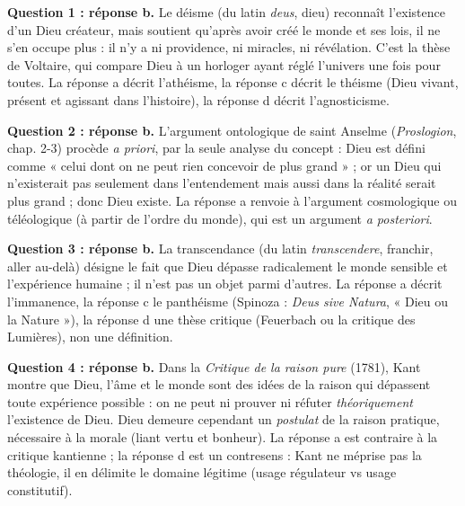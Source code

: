 \documentclass[11pt]{article}
\begin{document}
\begin{corrige}
\textbf{Question 1 : réponse b.} Le déisme (du latin \emph{deus}, dieu) reconnaît l'existence d'un Dieu créateur, mais soutient qu'après avoir créé le monde et ses lois, il ne s'en occupe plus : il n'y a ni providence, ni miracles, ni révélation. C'est la thèse de Voltaire, qui compare Dieu à un horloger ayant réglé l'univers une fois pour toutes. La réponse a décrit l'athéisme, la réponse c décrit le théisme (Dieu vivant, présent et agissant dans l'histoire), la réponse d décrit l'agnosticisme.

\textbf{Question 2 : réponse b.} L'argument ontologique de saint Anselme (\emph{Proslogion}, chap. 2-3) procède \emph{a priori}, par la seule analyse du concept : Dieu est défini comme « celui dont on ne peut rien concevoir de plus grand » ; or un Dieu qui n'existerait pas seulement dans l'entendement mais aussi dans la réalité serait plus grand ; donc Dieu existe. La réponse a renvoie à l'argument cosmologique ou téléologique (à partir de l'ordre du monde), qui est un argument \emph{a posteriori}.

\textbf{Question 3 : réponse b.} La transcendance (du latin \emph{transcendere}, franchir, aller au-delà) désigne le fait que Dieu dépasse radicalement le monde sensible et l'expérience humaine ; il n'est pas un objet parmi d'autres. La réponse a décrit l'immanence, la réponse c le panthéisme (Spinoza : \emph{Deus sive Natura}, « Dieu ou la Nature »), la réponse d une thèse critique (Feuerbach ou la critique des Lumières), non une définition.

\textbf{Question 4 : réponse b.} Dans la \emph{Critique de la raison pure} (1781), Kant montre que Dieu, l'âme et le monde sont des idées de la raison qui dépassent toute expérience possible : on ne peut ni prouver ni réfuter \emph{théoriquement} l'existence de Dieu. Dieu demeure cependant un \emph{postulat} de la raison pratique, nécessaire à la morale (liant vertu et bonheur). La réponse a est contraire à la critique kantienne ; la réponse d est un contresens : Kant ne méprise pas la théologie, il en délimite le domaine légitime (usage régulateur vs usage constitutif).
\end{corrige}
\end{document}
